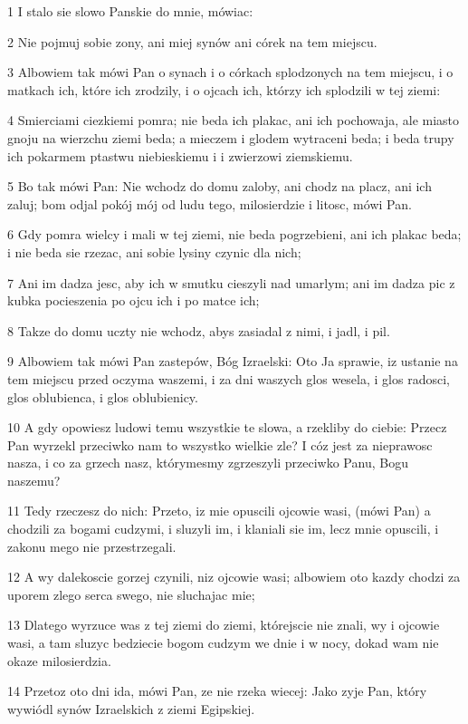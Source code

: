 \par 1 I stalo sie slowo Panskie do mnie, mówiac:
\par 2 Nie pojmuj sobie zony, ani miej synów ani córek na tem miejscu.
\par 3 Albowiem tak mówi Pan o synach i o córkach splodzonych na tem miejscu, i o matkach ich, które ich zrodzily, i o ojcach ich, którzy ich splodzili w tej ziemi:
\par 4 Smierciami ciezkiemi pomra; nie beda ich plakac, ani ich pochowaja, ale miasto gnoju na wierzchu ziemi beda; a mieczem i glodem wytraceni beda; i beda trupy ich pokarmem ptastwu niebieskiemu i i zwierzowi ziemskiemu.
\par 5 Bo tak mówi Pan: Nie wchodz do domu zaloby, ani chodz na placz, ani ich zaluj; bom odjal pokój mój od ludu tego, milosierdzie i litosc, mówi Pan.
\par 6 Gdy pomra wielcy i mali w tej ziemi, nie beda pogrzebieni, ani ich plakac beda; i nie beda sie rzezac, ani sobie lysiny czynic dla nich;
\par 7 Ani im dadza jesc, aby ich w smutku cieszyli nad umarlym; ani im dadza pic z kubka pocieszenia po ojcu ich i po matce ich;
\par 8 Takze do domu uczty nie wchodz, abys zasiadal z nimi, i jadl, i pil.
\par 9 Albowiem tak mówi Pan zastepów, Bóg Izraelski: Oto Ja sprawie, iz ustanie na tem miejscu przed oczyma waszemi, i za dni waszych glos wesela, i glos radosci, glos oblubienca, i glos oblubienicy.
\par 10 A gdy opowiesz ludowi temu wszystkie te slowa, a rzekliby do ciebie: Przecz Pan wyrzekl przeciwko nam to wszystko wielkie zle? I cóz jest za nieprawosc nasza, i co za grzech nasz, którymesmy zgrzeszyli przeciwko Panu, Bogu naszemu?
\par 11 Tedy rzeczesz do nich: Przeto, iz mie opuscili ojcowie wasi, (mówi Pan) a chodzili za bogami cudzymi, i sluzyli im, i klaniali sie im, lecz mnie opuscili, i zakonu mego nie przestrzegali.
\par 12 A wy dalekoscie gorzej czynili, niz ojcowie wasi; albowiem oto kazdy chodzi za uporem zlego serca swego, nie sluchajac mie;
\par 13 Dlatego wyrzuce was z tej ziemi do ziemi, którejscie nie znali, wy i ojcowie wasi, a tam sluzyc bedziecie bogom cudzym we dnie i w nocy, dokad wam nie okaze milosierdzia.
\par 14 Przetoz oto dni ida, mówi Pan, ze nie rzeka wiecej: Jako zyje Pan, który wywiódl synów Izraelskich z ziemi Egipskiej.
